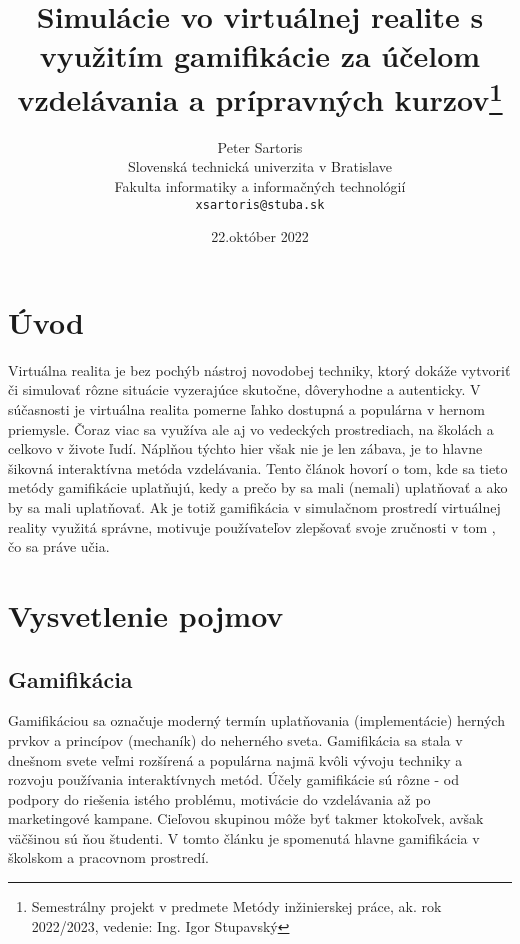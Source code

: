\documentclass[10pt,slovak,a4paper]{article}
\title{Simulácie vo virtuálnej realite s využitím gamifikácie za účelom vzdelávania a prípravných kurzov\thanks{Semestrálny projekt v predmete Metódy inžinierskej práce, ak. rok 2022/2023, vedenie: Ing. Igor Stupavský}}
\author{Peter Sartoris\\[2pt]
	{\small Slovenská technická univerzita v Bratislave}\\
	{\small Fakulta informatiky a informačných technológií}\\
	{\small \texttt{xsartoris@stuba.sk}}
	}
\date{\small 22.október 2022}
\begin{document}
\maketitle


\section{Úvod} \label{Abstract}

Virtuálna realita je bez pochýb nástroj novodobej techniky, ktorý dokáže vytvoriť či simulovať rôzne situácie vyzerajúce skutočne, dôveryhodne a autenticky.
V súčasnosti je virtuálna realita pomerne ľahko dostupná a populárna v hernom priemysle. Čoraz viac sa využíva ale aj vo vedeckých prostrediach, na školách a celkovo v živote ľudí. 
Náplňou týchto hier však nie je len zábava, je to hlavne šikovná interaktívna metóda vzdelávania.
Tento článok hovorí o tom, kde sa tieto metódy gamifikácie uplatňujú, kedy a prečo by sa mali (nemali) uplatňovať a ako by sa mali uplatňovať. %
Ak je totiž gamifikácia v simulačnom prostredí  virtuálnej reality využitá správne, motivuje používateľov zlepšovať svoje zručnosti v tom , čo sa práve učia.


\section{Vysvetlenie pojmov} \label{Terms}

\subsection{Gamifikácia} \label{Gamification:gamification}

Gamifikáciou sa označuje moderný termín uplatňovania (implementácie) herných prvkov a princípov (mechaník) do neherného sveta.
 Gamifikácia sa stala v dnešnom svete veľmi rozšírená a populárna najmä kvôli vývoju techniky a rozvoju používania interaktívnych metód.
Účely gamifikácie sú rôzne - od podpory do riešenia istého problému, motivácie do vzdelávania až po marketingové kampane. 
Cieľovou skupinou môže byť takmer ktokoľvek, avšak väčšinou sú ňou študenti. V tomto článku je spomenutá hlavne gamifikácia v školskom a pracovnom prostredí. \newline \newline
\end{document}
